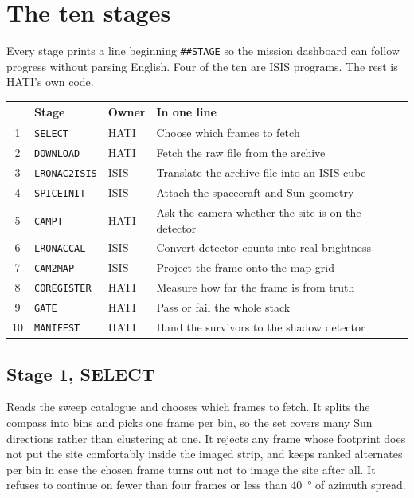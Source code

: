 \documentclass[11pt]{article}
\begin{document}
\section{The ten stages}

Every stage prints a line beginning \texttt{\#\#STAGE} so the mission dashboard can
follow progress without parsing English. Four of the ten are ISIS programs. The rest
is HATI's own code.

\begin{center}
\small
\begin{tabular}{@{}c l l p{6.9cm}@{}}
\toprule
& \sffamily\bfseries\color{hatinavy}Stage & \sffamily\bfseries\color{hatinavy}Owner
& \sffamily\bfseries\color{hatinavy}In one line \\
\midrule
1 & \texttt{SELECT}      & HATI & Choose which frames to fetch \\
2 & \texttt{DOWNLOAD}    & HATI & Fetch the raw file from the archive \\
3 & \texttt{LRONAC2ISIS} & ISIS & Translate the archive file into an ISIS cube \\
4 & \texttt{SPICEINIT}   & ISIS & Attach the spacecraft and Sun geometry \\
5 & \texttt{CAMPT}       & HATI & Ask the camera whether the site is on the detector \\
6 & \texttt{LRONACCAL}   & ISIS & Convert detector counts into real brightness \\
7 & \texttt{CAM2MAP}     & ISIS & Project the frame onto the map grid \\
8 & \texttt{COREGISTER}  & HATI & Measure how far the frame is from truth \\
9 & \texttt{GATE}        & HATI & Pass or fail the whole stack \\
10 & \texttt{MANIFEST}   & HATI & Hand the survivors to the shadow detector \\
\bottomrule
\end{tabular}
\end{center}

\subsection{Stage 1, SELECT}
Reads the sweep catalogue and chooses which frames to fetch. It splits the compass
into bins and picks one frame per bin, so the set covers many Sun directions rather
than clustering at one. It rejects any frame whose footprint does not put the site
comfortably inside the imaged strip, and keeps ranked alternates per bin in case the
chosen frame turns out not to image the site after all. It refuses to continue on
fewer than four frames or less than \SI{40}{\degree} of azimuth spread.
\end{document}
